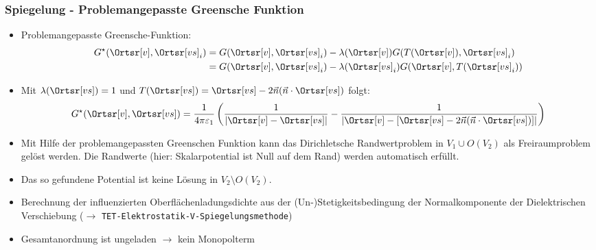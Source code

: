 \begin{frame}
  \frametitle{Spiegelung - Problemangepasste Greensche Funktion}

\begin{itemize}[<+->]
\item Problemangepasste Greensche-Funktion:
      \begin{align*}
         G^\star(\Ortsr[v],\Ortsr[vs]_i) & = G(\Ortsr[v],\Ortsr[vs]_i) -\lambda(\Ortsr[v]) G(T(\Ortsr[v]),\Ortsr[vs]_i)\\
         & = G(\Ortsr[v],\Ortsr[vs]_i) -\lambda(\Ortsr[vs]_i) G(\Ortsr[v],  T(\Ortsr[vs]_i))
      \end{align*}

    \item Mit $\lambda(\Ortsr[vs]) = 1$ und $T(\Ortsr[vs]) = \Ortsr[vs] - 2  \vec{n}  (\vec{n}\cdot \Ortsr[vs])$ folgt:
      \begin{equation*}
        G^\star(\Ortsr[v],\Ortsr[vs]) = \frac{1}{4\pi\varepsilon_1}  \left(  \frac{1}{\left|\Ortsr[v] -  \Ortsr[vs] \right|}  - \frac{1}{\left|\Ortsr[v] -  \left[ \Ortsr[vs] - 2 \vec{n} (\vec{n}\cdot \Ortsr[vs]) \right] \right|}\right)
      \end{equation*}
    \item Mit Hilfe der problemangepassten Greenschen Funktion kann das \alert{Dirichletsche Randwertproblem} in $V_1 \cup O(V_2)$ als \alert{Freiraumproblem} gelöst werden. Die Randwerte (hier: Skalarpotential ist Null auf dem Rand) werden automatisch erfüllt.
    \item Das so gefundene Potential ist \alert{keine Lösung} in $V_2 \setminus O(V_2)$.
    \item Berechnung der influenzierten Oberflächenladungsdichte aus der (Un-)Stetigkeitsbedingung der Normalkomponente der Dielektrischen Verschiebung ($\to$ \texttt{TET-Elektrostatik-V-Spiegelungsmethode})
      \item Gesamtanordnung ist \alert{ungeladen} $\to$ kein Monopolterm
    \end{itemize}
  
\end{frame}

